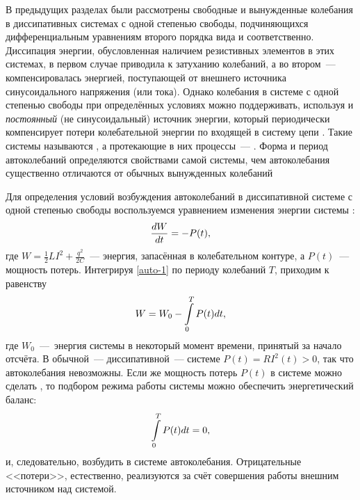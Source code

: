 \label{sec:auto}

В предыдущих разделах были рассмотрены свободные и вынужденные колебания в
диссипативных системах с одной степенью свободы, подчиняющихся дифференциальным
уравнениям второго порядка вида  и 
соответственно. Диссипация энергии, обусловленная наличием резистивных элементов
в этих системах, в первом случае приводила к затуханию колебаний, а во
втором~--- компенсировалась энергией, поступающей от
внешнего источника синусоидального напряжения (или тока). Однако колебания в
системе с одной степенью свободы при определённых условиях можно поддерживать,
используя и \emph{постоянный} (не синусоидальный) источник энергии, 
который периодически компенсирует потери колебательной энергии по входящей 
в систему цепи . 
Такие системы называются , а протекающие в
них процессы~--- . Форма и период автоколебаний
определяются свойствами самой системы, чем автоколебания существенно отличаются
от обычных вынужденных колебаний

Для определения условий возбуждения автоколебаний в диссипативной системе с
одной степенью свободы воспользуемся уравнением изменения энергии 
системы :
\begin{equation}
	\eqmark{auto-1}
	\frac{dW}{dt}=-P(t),
\end{equation}
где $W=\frac12 LI^2+ \frac{q^2}{2C}$~--- энергия, запасённая в колебательном контуре,
а $P(t)$~--- мощность потерь. 
Интегрируя \eqref{auto-1} по периоду колебаний $T$, приходим 
к равенству
\begin{equation}
	\eqmark{auto-2}
	W=W_0-\int\limits_{0}^{T}P(t)dt,
\end{equation}
где $W_0$~---~энергия системы в некоторый момент времени, принятый за начало
отсчёта. В обычной~--- диссипативной~--- системе $P(t)=RI^{2}(t)>0$, 
так что автоколебания невозможны. 
Если же мощность потерь $P(t)$ в системе можно сделать , 
то подбором режима работы системы можно обеспечить энергетический баланс:
\begin{equation}
	\eqmark{auto-3}
	\int\limits_{0}^{T} P(t) dt = 0,
\end{equation}
и, следовательно, возбудить в системе автоколебания. Отрицательные
<<потери>>, естественно, реализуются за счёт совершения 
работы внешним источником над системой.

